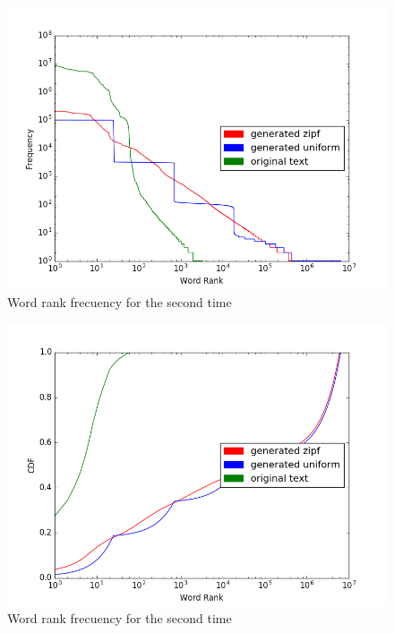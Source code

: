 \documentclass{WeSTassignment}
\begin{document}
\begin{figure}[h!]
  \centering
  \includegraphics[scale=0.5]{word_rank_freq_2.png}
   \caption{Word rank frecuency for the second time}
     \label{fig:dig} 
\end{figure}

\begin{figure}[h!]
  \centering
  \includegraphics[scale=0.5]{cdf_2.png}
   \caption{Word rank frecuency for the second time}
     \label{fig:dig} 
\end{figure}
\end{document}
